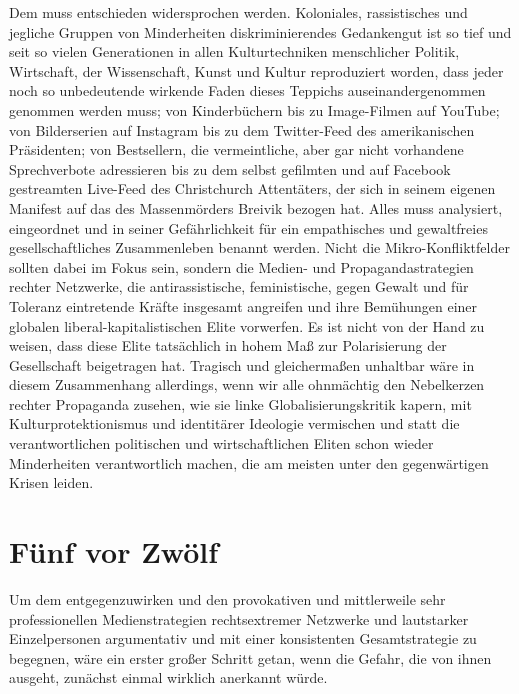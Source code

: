 \documentclass[a4paper,
fontsize=11pt,
oneside,
numbers=noperiodatend,
parskip=half-,
bibliography=totoc,
final
]{scrartcl}
\begin{document}
Dem muss entschieden widersprochen werden. Koloniales, rassistisches und
jegliche Gruppen von Minderheiten diskriminierendes Gedankengut ist so
tief und seit so vielen Generationen in allen Kulturtechniken
menschlicher Politik, Wirtschaft, der Wissenschaft, Kunst und Kultur
reproduziert worden, dass jeder noch so unbedeutende wirkende Faden
dieses Teppichs auseinandergenommen genommen werden muss; von
Kinderbüchern bis zu Image-Filmen auf YouTube; von Bilderserien auf
Instagram bis zu dem Twitter-Feed des amerikanischen Präsidenten; von
Bestsellern, die vermeintliche, aber gar nicht vorhandene Sprechverbote
adressieren bis zu dem selbst gefilmten und auf Facebook gestreamten
Live-Feed des Christchurch Attentäters, der sich in seinem eigenen
Manifest auf das des Massenmörders Breivik bezogen hat. Alles muss
analysiert, eingeordnet und in seiner Gefährlichkeit für ein
empathisches und gewaltfreies gesellschaftliches Zusammenleben benannt
werden. Nicht die Mikro-Konfliktfelder sollten dabei im Fokus sein,
sondern die Medien- und Propagandastrategien rechter Netzwerke, die
antirassistische, feministische, gegen Gewalt und für Toleranz
eintretende Kräfte insgesamt angreifen und ihre Bemühungen einer
globalen liberal-kapitalistischen Elite vorwerfen. Es ist nicht von der
Hand zu weisen, dass diese Elite tatsächlich in hohem Maß zur
Polarisierung der Gesellschaft beigetragen hat. Tragisch und
gleichermaßen unhaltbar wäre in diesem Zusammenhang allerdings, wenn wir
alle ohnmächtig den Nebelkerzen rechter Propaganda zusehen, wie sie
linke Globalisierungskritik kapern, mit Kulturprotektionismus und
identitärer Ideologie vermischen und statt die verantwortlichen
politischen und wirtschaftlichen Eliten schon wieder Minderheiten
verantwortlich machen, die am meisten unter den gegenwärtigen Krisen
leiden.

\hypertarget{fuxfcnf-vor-zwuxf6lf}{%
\section*{Fünf vor Zwölf}\label{fuxfcnf-vor-zwuxf6lf}}

Um dem entgegenzuwirken und den provokativen und mittlerweile sehr
professionellen Medienstrategien rechtsextremer Netzwerke und
lautstarker Einzelpersonen argumentativ und mit einer konsistenten
Gesamtstrategie zu begegnen, wäre ein erster großer Schritt getan, wenn
die Gefahr, die von ihnen ausgeht, zunächst einmal wirklich anerkannt
würde.
\end{document}

